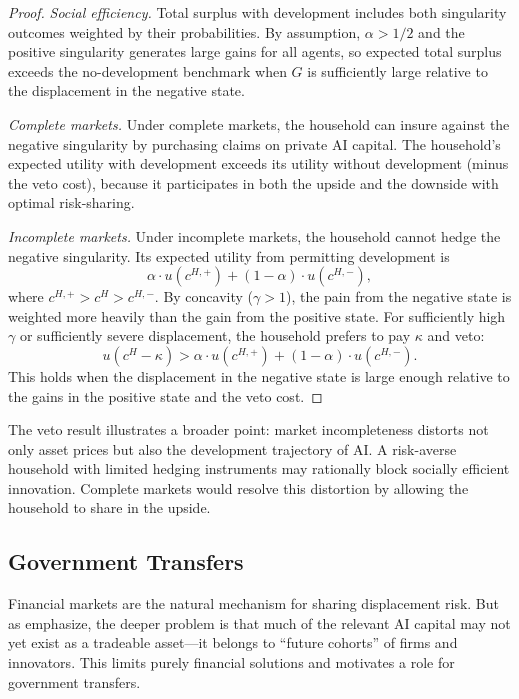 \documentclass[12pt]{article}
\begin{document}
\begin{proof}
\emph{Social efficiency.} Total surplus with development includes both singularity outcomes weighted by their probabilities. By assumption, $\alpha > 1/2$ and the positive singularity generates large gains for all agents, so expected total surplus exceeds the no-development benchmark when $G$ is sufficiently large relative to the displacement in the negative state.

\emph{Complete markets.} Under complete markets, the household can insure against the negative singularity by purchasing claims on private AI capital. The household's expected utility with development exceeds its utility without development (minus the veto cost), because it participates in both the upside and the downside with optimal risk-sharing.

\emph{Incomplete markets.} Under incomplete markets, the household cannot hedge the negative singularity. Its expected utility from permitting development is
\[
\alpha \cdot u(c^{H,+}) + (1-\alpha) \cdot u(c^{H,-}),
\]
where $c^{H,+} > c^H > c^{H,-}$. By concavity ($\gamma > 1$), the pain from the negative state is weighted more heavily than the gain from the positive state. For sufficiently high $\gamma$ or sufficiently severe displacement, the household prefers to pay $\kappa$ and veto:
\[
u(c^H - \kappa) > \alpha \cdot u(c^{H,+}) + (1-\alpha) \cdot u(c^{H,-}).
\]
This holds when the displacement in the negative state is large enough relative to the gains in the positive state and the veto cost.
\end{proof}

The veto result illustrates a broader point: market incompleteness distorts not only asset prices but also the development trajectory of AI. A risk-averse household with limited hedging instruments may rationally block socially efficient innovation. Complete markets would resolve this distortion by allowing the household to share in the upside.

\subsection{Government Transfers}

Financial markets are the natural mechanism for sharing displacement risk. But as \citet{GKP2012} emphasize, the deeper problem is that much of the relevant AI capital may not yet exist as a tradeable asset---it belongs to ``future cohorts'' of firms and innovators. This limits purely financial solutions and motivates a role for government transfers.
\end{document}
